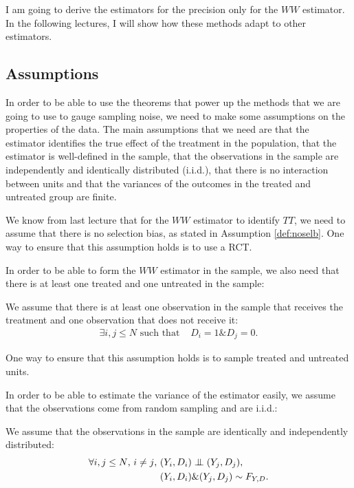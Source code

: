 \documentclass[]{book}
\newcommand\Ind{\protect\mathpalette{\protect\independenT}{\perp}}
\def\independenT#1#2{\mathrel{\setbox0\hbox{$#1#2$}\copy0\kern-\wd0\mkern4mu\box0}}
\theoremstyle{definition}
\theoremstyle{definition}
\theoremstyle{definition}
\theoremstyle{remark}
\let\BeginKnitrBlock\begin \let\EndKnitrBlock\end
\begin{document}
\BeginKnitrBlock{remark}
\iffalse{} {Remark. } \fi{}I am going to derive the estimators for the precision only for the \(WW\) estimator.
In the following lectures, I will show how these methods adapt to other estimators.
\EndKnitrBlock{remark}

\hypertarget{sec:assumptions}{%
\subsection{Assumptions}\label{sec:assumptions}}

In order to be able to use the theorems that power up the methods that we are going to use to gauge sampling noise, we need to make some assumptions on the properties of the data.
The main assumptions that we need are that the estimator identifies the true effect of the treatment in the population, that the estimator is well-defined in the sample, that the observations in the sample are independently and identically distributed (i.i.d.), that there is no interaction between units and that the variances of the outcomes in the treated and untreated group are finite.

We know from last lecture that for the \(WW\) estimator to identify \(TT\), we need to assume that there is no selection bias, as stated in Assumption \ref{def:noselb}.
One way to ensure that this assumption holds is to use a RCT.

In order to be able to form the \(WW\) estimator in the sample, we also need that there is at least one treated and one untreated in the sample:

\BeginKnitrBlock{definition}[Full rank]
\protect\hypertarget{def:fullrank}{}{\label{def:fullrank} \iffalse (Full rank) \fi{} }We assume that there is at least one observation in the sample that receives the treatment and one observation that does not receive it:
\begin{align*}
\exists i,j\leq N \text{ such that } & D_i=1 \& D_j=0.
\end{align*}
\EndKnitrBlock{definition}

One way to ensure that this assumption holds is to sample treated and untreated units.

In order to be able to estimate the variance of the estimator easily, we assume that the observations come from random sampling and are i.i.d.:

\BeginKnitrBlock{definition}[i.i.d. sampling]
\protect\hypertarget{def:iid}{}{\label{def:iid} \iffalse (i.i.d. sampling) \fi{} }We assume that the observations in the sample are identically and independently distributed:
\begin{align*}
\forall i,j\leq N\text{, }i\neq j\text{, } & (Y_i,D_i)\Ind(Y_j,D_j),\\
                                           & (Y_i,D_i)\&(Y_j,D_j)\sim F_{Y,D}.
\end{align*}
\EndKnitrBlock{definition}
\end{document}
